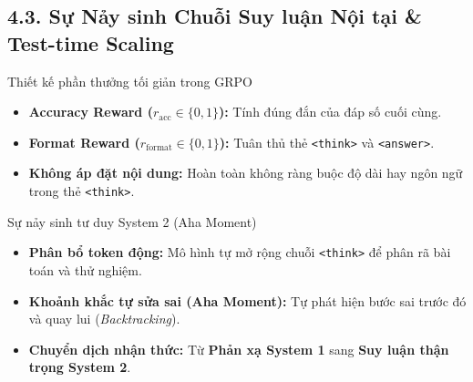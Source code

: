 \subsection{4.3. Sự Nảy sinh Chuỗi Suy luận Nội tại \& Test-time Scaling}

\begin{frame}{Thiết kế phần thưởng tối giản trong GRPO}
  \small
  \begin{itemize}\setlength{\itemsep}{6pt}
    \item \textbf{Accuracy Reward ($r_{\text{acc}} \in \{0, 1\}$):} Tính đúng đắn của đáp số cuối cùng.
    \item \textbf{Format Reward ($r_{\text{format}} \in \{0, 1\}$):} Tuân thủ thẻ \texttt{<think>} và \texttt{<answer>}.
    \item \textbf{Không áp đặt nội dung:} Hoàn toàn không ràng buộc độ dài hay ngôn ngữ trong thẻ \texttt{<think>}.
  \end{itemize}
  \par\vspace{0pt}
\end{frame}

\begin{frame}{Sự nảy sinh tư duy System 2 (Aha Moment)}
  \small
  \begin{itemize}\setlength{\itemsep}{6pt}
    \item \textbf{Phân bổ token động:} Mô hình tự mở rộng chuỗi \texttt{<think>} để phân rã bài toán và thử nghiệm.
    \item \textbf{Khoảnh khắc tự sửa sai (Aha Moment):} Tự phát hiện bước sai trước đó và quay lui (\textit{Backtracking}).
    \item \textbf{Chuyển dịch nhận thức:} Từ \textbf{Phản xạ System 1} sang \textbf{Suy luận thận trọng System 2}.
  \end{itemize}
  \par\vspace{0pt}
\end{frame}

